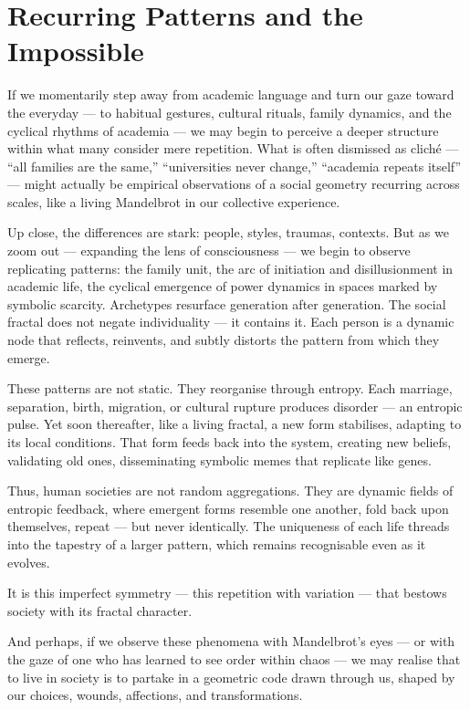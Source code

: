 \section{Recurring Patterns and the Impossible}

If we momentarily step away from academic language and turn our gaze toward the everyday — to habitual gestures, cultural rituals, family dynamics, and the cyclical rhythms of academia — we may begin to perceive a deeper structure within what many consider mere repetition. What is often dismissed as cliché — “all families are the same,” “universities never change,” “academia repeats itself” — might actually be empirical observations of a social geometry recurring across scales, like a living Mandelbrot in our collective experience.

Up close, the differences are stark: people, styles, traumas, contexts. But as we zoom out — expanding the lens of consciousness — we begin to observe replicating patterns: the family unit, the arc of initiation and disillusionment in academic life, the cyclical emergence of power dynamics in spaces marked by symbolic scarcity. Archetypes resurface generation after generation. The social fractal does not negate individuality — it contains it. Each person is a dynamic node that reflects, reinvents, and subtly distorts the pattern from which they emerge.

These patterns are not static. They reorganise through entropy. Each marriage, separation, birth, migration, or cultural rupture produces disorder — an entropic pulse. Yet soon thereafter, like a living fractal, a new form stabilises, adapting to its local conditions. That form feeds back into the system, creating new beliefs, validating old ones, disseminating symbolic memes that replicate like genes.

Thus, human societies are not random aggregations. They are dynamic fields of entropic feedback, where emergent forms resemble one another, fold back upon themselves, repeat — but never identically. The uniqueness of each life threads into the tapestry of a larger pattern, which remains recognisable even as it evolves.

It is this imperfect symmetry — this repetition with variation — that bestows society with its fractal character.

And perhaps, if we observe these phenomena with Mandelbrot’s eyes — or with the gaze of one who has learned to see order within chaos — we may realise that to live in society is to partake in a geometric code drawn through us, shaped by our choices, wounds, affections, and transformations.